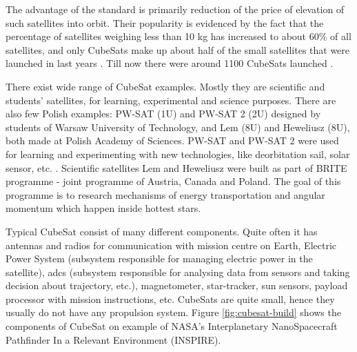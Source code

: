 \documentclass[12pt,a4paper,twoside]{article}
\begin{document}
The advantage of the standard is primarily reduction of the price of elevation of such satellites into orbit. Their popularity is evidenced by the fact that the percentage of satellites weighing less than 10 kg has increased to about 60\% of all satellites, and only CubeSats make up about half of the small satellites that were launched in last years \cite{swartwout2011brief}\cite{swartwout2013first}. Till now there were around 1100 CubeSats launched \cite{nanosats}.

There exist wide range of CubeSat examples. Mostly they are scientific and students' satellites, for learning, experimental and science purposes. There are also few Polish examples: PW-SAT (1U) and PW-SAT 2 (2U) designed by students of Warsaw University of Technology, and Lem (8U) and Heweliusz (8U), both made at Polish Academy of Sciences. PW-SAT and PW-SAT 2 were used for learning and experimenting with new technologies, like deorbitation sail, solar sensor, etc. \cite{pw-sat2}.
Scientific satellites Lem and Heweliusz were built as part of BRITE programme - joint programme of Austria, Canada and Poland. The goal of this programme is to research mechanisms of energy transportation and angular momentum which happen inside hottest stars\cite{brite-pl}.

Typical CubeSat consist of many different components. Quite often it has antennas and radios for communication with mission centre on Earth, Electric Power System (subsystem responsible for managing electric power in the satellite), \gls{adcs} (subsystem responsible for analysing data from sensors and taking decision about trajectory, etc.), magnetometer, star-tracker, sun sensors, payload processor with mission instructions, etc. CubeSats are quite small, hence they usually do not have any propulsion system\cite{lemmer2017propulsion}. Figure \ref{fig:cubesat-build} shows the components of CubeSat on example of NASA's Interplanetary NanoSpacecraft Pathfinder In a Relevant Environment (INSPIRE).
\end{document}
